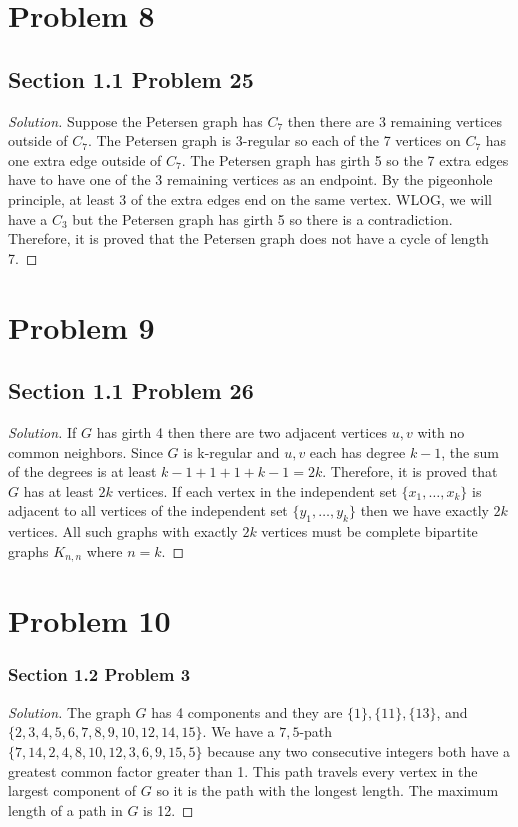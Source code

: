 \documentclass[12pt]{article}
\newenvironment{solution}{\begin{proof}[Solution]}{\end{proof}}
\begin{document}
\section*{Problem 8}
\subsection*{Section 1.1 Problem 25}
\begin{solution}
    Suppose the Petersen graph has \(C_7\) then there are 3 remaining vertices
    outside of \(C_7\). The Petersen graph is 3-regular so each of the 7
    vertices on \(C_7\) has one extra edge outside of \(C_7\). The Petersen
    graph has girth 5 so the 7 extra edges have to have one of the 3 remaining
    vertices as an endpoint. By the pigeonhole principle, at least 3 of the
    extra edges end on the same vertex. WLOG, we will have a \(C_3\) but the
    Petersen graph has girth 5 so there is a contradiction. Therefore, it is
    proved that the Petersen graph does not have a cycle of length 7.
\end{solution}

\section*{Problem 9}
\subsection*{Section 1.1 Problem 26}
\begin{solution}
    If \(G\) has girth 4 then there are two adjacent vertices \(u, v\) with no
    common neighbors. Since \(G\) is k-regular and \(u,v\) each has degree
    \(k-1\), the sum of the degrees is at least \(k-1+1+1+k-1=2k\). Therefore,
    it is proved that \(G\) has at least \(2k\) vertices. If each vertex in the
    independent set \(\{x_1,\dots,x_{k}\}\) is adjacent to all vertices of
    the independent set \(\{y_1,\dots,y_{k}\}\) then we have exactly \(2k\)
    vertices. All such graphs with exactly \(2k\) vertices must be complete
    bipartite graphs \(K_{n,n}\) where \(n=k\).
\end{solution}

\section{Problem 10}
\subsubsection*{Section 1.2 Problem 3}
\begin{solution}
    The graph \(G\) has 4 components and they are \(\{1\},\{11\},\{13\}\), and \\
    \(\{2,3,4,5,6,7,8,9,10,12,14,15\}\). We have a \(7,5\)-path \(\{7,14,2,4,8,10,12,3,6,9,15,5\}\)
    because any two consecutive integers both have a greatest common factor
    greater than 1. This path travels every vertex in the largest component of
    \(G\) so it is the path with the longest length. The maximum length of a
    path in \(G\) is 12.
\end{solution}
\end{document}

